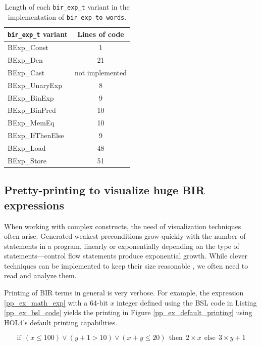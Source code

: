 \documentclass{kththesis}
\begin{document}
\begin{table}[ht!]
    \centering
    \begin{tabular}{ | l | c | }
        \hline
        \texttt{bir\_exp\_t} variant & Lines of code\\
        \hline
        BExp\_Const & 1\\
        BExp\_Den & 21\\
        BExp\_Cast & not implemented\\
        BExp\_UnaryExp & 8\\
        BExp\_BinExp & 9\\
        BExp\_BinPred & 10\\
        BExp\_MemEq & 10\\
        BExp\_IfThenElse & 9\\
        BExp\_Load & 48\\
        BExp\_Store & 51\\
        \hline
    \end{tabular}
    \caption{Length of each \texttt{bir\_exp\_t} variant in the implementation of \texttt{bir\_exp\_to\_words}.}
    \label{bir_exp_to_words_variants_loc}
\end{table}

\subsection{Pretty-printing to visualize huge BIR expressions}

When working with complex constructs, the need of visualization techniques often arise. Generated weakest preconditions grow quickly with the number of statements in a program, linearly or exponentially depending on the type of statements---control flow statements produce exponential growth. While clever techniques can be implemented to keep their size reasonable \cite{lindner_trabin:_2019}, we often need to read and analyze them.

Printing of BIR terms in general is very verbose. For example, the expression \ref{pp_ex_math_exp} with a 64-bit $x$ integer defined using the BSL code in Listing \ref{pp_ex_bsl_code} yields the printing in Figure \ref{pp_ex_default_printing} using HOL4's default printing capabilities.

\begin{equation}
    \text{if}~~(x \leq 100) \lor (y + 1 > 10) \lor (x + y \leq 20)~~\text{then}~~2 \times x~~\text{else}~~3 \times y + 1
    \label{pp_ex_math_exp}
\end{equation}
\end{document}
